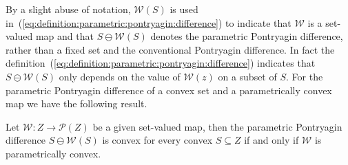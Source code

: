 \documentclass[smallextended]{svjour3}       %
\numberwithin{equation}{section}
\begin{document}
%
By a slight abuse of notation, $\mathcal{W}(S)$ is used in~(\ref{eq:definition:parametric:pontryagin:difference}) to indicate that $\mathcal{W}$ is a set-valued map and that $S\ominus\mathcal{W}(S)$ denotes the parametric Pontryagin difference, rather than a fixed set and the conventional Pontryagin difference. 
%
In fact the definition~(\ref{eq:definition:parametric:pontryagin:difference}) indicates that $S\ominus \mathcal{W}(S)$ only depends on the value of $\mathcal{W}(z)$ on a subset of $S$. 
%
%
For the parametric Pontryagin difference of a convex set and a parametrically convex map we 
have the following result.
%
\begin{theorem}\label{thm:convexity:of:pontryagin:difference}
Let $\mathcal W: Z\rightarrow\mathscr P(Z)$ be a given set-valued map, then the parametric Pontryagin difference $S \ominus \mathcal W(S)$ is convex for every convex $S\subseteq Z$ if and only if $\mathcal W$ is parametrically convex.
\end{theorem}
%
\end{document}
